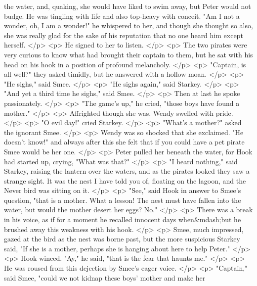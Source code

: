       the water, and, quaking, she would have liked to swim away, but Peter
      would not budge. He was tingling with life and also top-heavy with
      conceit. "Am I not a wonder, oh, I am a wonder!" he whispered to her, and
      though she thought so also, she was really glad for the sake of his
      reputation that no one heard him except herself.
    </p>
    <p>
      He signed to her to listen.
    </p>
    <p>
      The two pirates were very curious to know what had brought their captain
      to them, but he sat with his head on his hook in a position of profound
      melancholy.
    </p>
    <p>
      "Captain, is all well?" they asked timidly, but he answered with a hollow
      moan.
    </p>
    <p>
      "He sighs," said Smee.
    </p>
    <p>
      "He sighs again," said Starkey.
    </p>
    <p>
      "And yet a third time he sighs," said Smee.
    </p>
    <p>
      Then at last he spoke passionately.
    </p>
    <p>
      "The game's up," he cried, "those boys have found a mother."
    </p>
    <p>
      Affrighted though she was, Wendy swelled with pride.
    </p>
    <p>
      "O evil day!" cried Starkey.
    </p>
    <p>
      "What's a mother?" asked the ignorant Smee.
    </p>
    <p>
      Wendy was so shocked that she exclaimed. "He doesn't know!" and always
      after this she felt that if you could have a pet pirate Smee would be her
      one.
    </p>
    <p>
      Peter pulled her beneath the water, for Hook had started up, crying, "What
      was that?"
    </p>
    <p>
      "I heard nothing," said Starkey, raising the lantern over the waters, and
      as the pirates looked they saw a strange sight. It was the nest I have
      told you of, floating on the lagoon, and the Never bird was sitting on it.
    </p>
    <p>
      "See," said Hook in answer to Smee's question, "that is a mother. What a
      lesson! The nest must have fallen into the water, but would the mother
      desert her eggs? No."
    </p>
    <p>
      There was a break in his voice, as if for a moment he recalled innocent
      days when&mdash;but he brushed away this weakness with his hook.
    </p>
    <p>
      Smee, much impressed, gazed at the bird as the nest was borne past, but
      the more suspicious Starkey said, "If she is a mother, perhaps she is
      hanging about here to help Peter."
    </p>
    <p>
      Hook winced. "Ay," he said, "that is the fear that haunts me."
    </p>
    <p>
      He was roused from this dejection by Smee's eager voice.
    </p>
    <p>
      "Captain," said Smee, "could we not kidnap these boys' mother and make her
